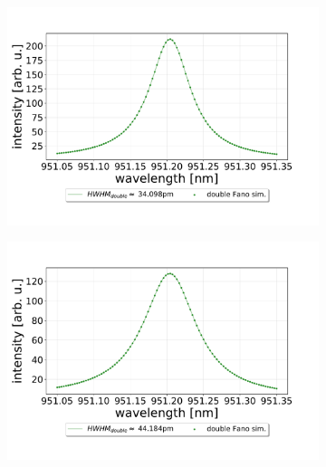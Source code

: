 \begin{figure}[h!]
\begin{subfigure}[b]{0.49\textwidth}
        \caption{}
        \label{fig:2_percent_loss}
    \end{subfigure}
    \begin{subfigure}[b]{0.49\textwidth}
        \includegraphics[width=\textwidth]{figures/double_4percent_loss_30um.pdf}
        \caption{}
        \label{fig:4_percent_loss}
    \end{subfigure}
    \begin{subfigure}[b]{0.49\textwidth}
        \includegraphics[width=\textwidth]{figures/double_8percent_loss_30um.pdf}
        \caption{}
        \label{fig:8_percent_loss}
    \end{subfigure}
    \begin{subfigure}[b]{0.49\textwidth}

\end{subfigure}
\end{figure}
